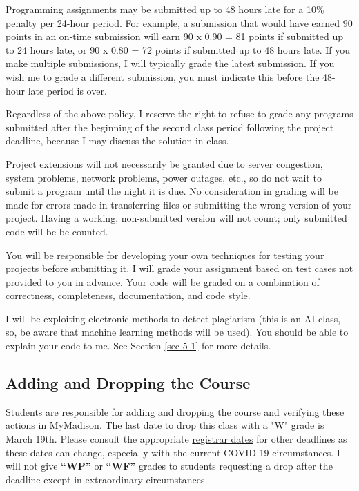 \documentclass[11pt]{article}
\begin{document}
Programming assignments may be submitted up to 48 hours late for a 10\% penalty per 24-hour period. For example, a submission that would have
earned 90 points in an on-time submission will earn 90 x 0.90 = 81 points if submitted up to 24 hours late, or 90 x 0.80 = 72 points 
if submitted up to 48 hours late. If you make multiple submissions, I will typically grade the latest submission. If you wish me 
to grade a different submission, you must indicate this before the 48-hour late period is over. 

Regardless of the above policy, I reserve the right to refuse to grade any programs 
submitted after the beginning of the second class period following the project deadline, 
because I may discuss the solution in class. 

Project extensions will not necessarily be granted due to server congestion, system problems, network problems, 
power outages, etc., so do not wait to submit a program until the night it is due. 
No consideration in grading will be made for errors made in transferring files or submitting the wrong version of your project. 
Having a working, non-submitted version will not count; only submitted code will be be counted. 

You will be responsible for developing your own techniques for testing your projects before 
submitting it. I will grade your assignment based on test cases not provided to you in advance. 
Your code will be graded on a combination of correctness, completeness, documentation, and code style. 

I will be exploiting electronic methods to detect plagiarism
(this is an AI class, so, be aware that machine learning methods will be used).  
You should be able to explain your code to me.  
See Section \ref{sec-5-1} for more details.



\subsection{Adding and Dropping the Course}

Students are responsible for adding and dropping the course and verifying
these actions in \mbox{MyMadison}.   The last date to
drop this class with a "W" grade is March 19th.  
Please consult the appropriate 
\href{https://www.jmu.edu/registrar/students/print_dates.shtml}{registrar dates} for other deadlines as these dates
can change, especially with the current COVID-19 circumstances.
I will not give {\bf ``WP''}  or {\bf ``WF''} grades to students requesting a drop after the deadline except in extraordinary circumstances. 
\end{document}
